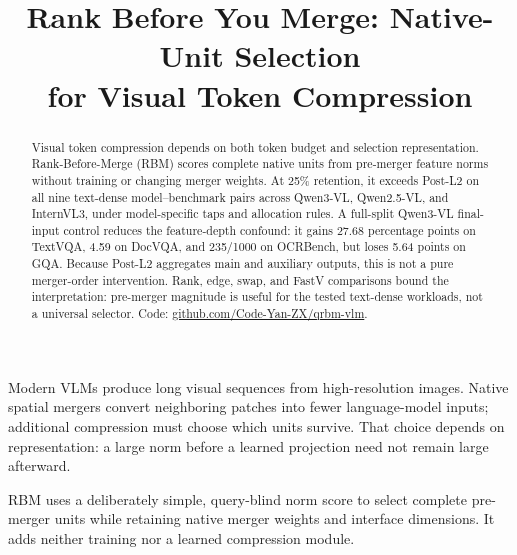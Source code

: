 \documentclass[smallabstract,smallcaptions]{dccpaper}
\begin{document}
\title{\large\textbf{Rank Before You Merge: Native-Unit Selection\\
for Visual Token Compression}}
\author{}
\maketitle
\thispagestyle{empty}

\begin{abstract}
Visual token compression depends on both token budget and selection representation. Rank-Before-Merge (RBM) scores complete native units from pre-merger feature norms without training or changing merger weights. At 25\% retention, it exceeds Post-L2 on all nine text-dense model--benchmark pairs across Qwen3-VL, Qwen2.5-VL, and InternVL3, under model-specific taps and allocation rules. A full-split Qwen3-VL final-input control reduces the feature-depth confound: it gains 27.68 percentage points on TextVQA, 4.59 on DocVQA, and 235/1000 on OCRBench, but loses 5.64 points on GQA. Because Post-L2 aggregates main and auxiliary outputs, this is not a pure merger-order intervention. Rank, edge, swap, and FastV comparisons bound the interpretation: pre-merger magnitude is useful for the tested text-dense workloads, not a universal selector. Code: \href{https://github.com/Code-Yan-ZX/qrbm-vlm}{github.com/Code-Yan-ZX/qrbm-vlm}.
\end{abstract}

Modern VLMs produce long visual sequences from high-resolution images. Native spatial mergers convert neighboring patches into fewer language-model inputs; additional compression must choose which units survive. That choice depends on representation: a large norm before a learned projection need not remain large afterward.

RBM uses a deliberately simple, query-blind norm score to select complete pre-merger units while retaining native merger weights and interface dimensions. It adds neither training nor a learned compression module.
\end{document}
